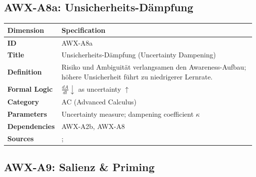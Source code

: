 
\subsection{AWX-A8a: Unsicherheits-Dämpfung}

\begin{table}[htbp]
\small
\begin{tabular}{p{3cm}p{11cm}}
\toprule
\textbf{Dimension} & \textbf{Specification} \\
\midrule
\textbf{ID} & AWX-A8a \\
\textbf{Title} & Unsicherheits-Dämpfung (Uncertainty Dampening) \\
\textbf{Definition} & Risiko und Ambiguität verlangsamen den Awareness-Aufbau; höhere Unsicherheit führt zu niedrigerer Lernrate. \\
\textbf{Formal Logic} & $\frac{dA}{dt} \downarrow$ as uncertainty $\uparrow$ \\
\textbf{Category} & AC (Advanced Calculus) \\
\textbf{Parameters} & Uncertainty measure; dampening coefficient $\kappa$ \\
\textbf{Dependencies} & AWX-A2b, AWX-A8 \\
\textbf{Sources} & \citet{ellsberg1961risk}; \citet{camerer1992recent} \\
\bottomrule
\end{tabular}
\end{table}


\subsection{AWX-A9: Salienz \& Priming}


